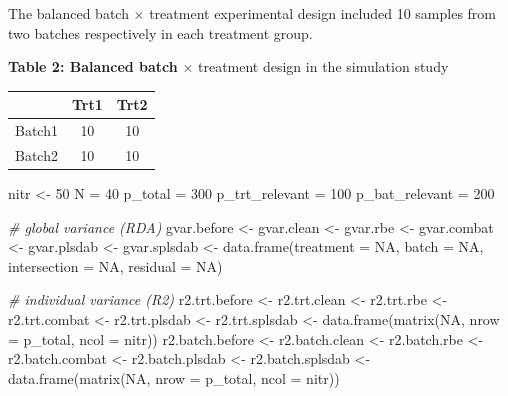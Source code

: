 \documentclass[
]{book}
\newenvironment{Shaded}{\begin{snugshade}}{\end{snugshade}}
\newcommand{\AttributeTok}[1]{\textcolor[rgb]{0.77,0.63,0.00}{#1}}
\newcommand{\CommentTok}[1]{\textcolor[rgb]{0.56,0.35,0.01}{\textit{#1}}}
\newcommand{\ConstantTok}[1]{\textcolor[rgb]{0.00,0.00,0.00}{#1}}
\newcommand{\DecValTok}[1]{\textcolor[rgb]{0.00,0.00,0.81}{#1}}
\newcommand{\FunctionTok}[1]{\textcolor[rgb]{0.00,0.00,0.00}{#1}}
\newcommand{\NormalTok}[1]{#1}
\newcommand{\OtherTok}[1]{\textcolor[rgb]{0.56,0.35,0.01}{#1}}
\begin{document}
The balanced batch \(\times\) treatment experimental design included 10 samples from two batches respectively in each treatment group.

\textbf{Table 2: Balanced batch} \(\times\) treatment design in the simulation study

\begin{longtable}[]{@{}ccc@{}}
\toprule()
& Trt1 & Trt2 \\
\midrule()
\endhead
Batch1 & 10 & 10 \\
Batch2 & 10 & 10 \\
\bottomrule()
\end{longtable}

\begin{Shaded}
\begin{Highlighting}[]
\NormalTok{nitr }\OtherTok{\textless{}{-}} \DecValTok{50}
\NormalTok{N }\OtherTok{=} \DecValTok{40}
\NormalTok{p\_total }\OtherTok{=} \DecValTok{300}
\NormalTok{p\_trt\_relevant }\OtherTok{=} \DecValTok{100} 
\NormalTok{p\_bat\_relevant }\OtherTok{=} \DecValTok{200} 

\CommentTok{\# global variance (RDA)}
\NormalTok{gvar.before }\OtherTok{\textless{}{-}}\NormalTok{ gvar.clean }\OtherTok{\textless{}{-}} 
\NormalTok{  gvar.rbe }\OtherTok{\textless{}{-}}\NormalTok{ gvar.combat }\OtherTok{\textless{}{-}} 
\NormalTok{  gvar.plsdab }\OtherTok{\textless{}{-}}\NormalTok{ gvar.splsdab }\OtherTok{\textless{}{-}} \FunctionTok{data.frame}\NormalTok{(}\AttributeTok{treatment =} \ConstantTok{NA}\NormalTok{, }\AttributeTok{batch =} \ConstantTok{NA}\NormalTok{,  }
                                            \AttributeTok{intersection =} \ConstantTok{NA}\NormalTok{, }
                                            \AttributeTok{residual =} \ConstantTok{NA}\NormalTok{)}

\CommentTok{\# individual variance (R2)}
\NormalTok{r2.trt.before }\OtherTok{\textless{}{-}}\NormalTok{ r2.trt.clean }\OtherTok{\textless{}{-}} 
\NormalTok{  r2.trt.rbe  }\OtherTok{\textless{}{-}}\NormalTok{ r2.trt.combat }\OtherTok{\textless{}{-}} 
\NormalTok{  r2.trt.plsdab }\OtherTok{\textless{}{-}}\NormalTok{ r2.trt.splsdab }\OtherTok{\textless{}{-}} \FunctionTok{data.frame}\NormalTok{(}\FunctionTok{matrix}\NormalTok{(}\ConstantTok{NA}\NormalTok{, }\AttributeTok{nrow =}\NormalTok{ p\_total, }
                                                       \AttributeTok{ncol =}\NormalTok{ nitr))}
\NormalTok{r2.batch.before }\OtherTok{\textless{}{-}}\NormalTok{ r2.batch.clean }\OtherTok{\textless{}{-}} 
\NormalTok{  r2.batch.rbe  }\OtherTok{\textless{}{-}}\NormalTok{ r2.batch.combat }\OtherTok{\textless{}{-}} 
\NormalTok{  r2.batch.plsdab }\OtherTok{\textless{}{-}}\NormalTok{ r2.batch.splsdab }\OtherTok{\textless{}{-}} \FunctionTok{data.frame}\NormalTok{(}\FunctionTok{matrix}\NormalTok{(}\ConstantTok{NA}\NormalTok{, }\AttributeTok{nrow =}\NormalTok{ p\_total, }
                                                           \AttributeTok{ncol =}\NormalTok{ nitr))}


\end{Highlighting}
\end{Shaded}
\end{document}
